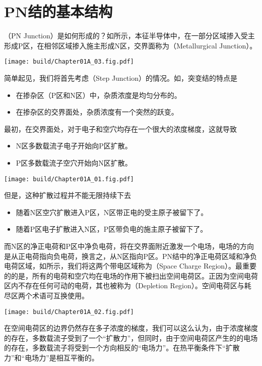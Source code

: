 \section{PN结的基本结构}

（PN Junction）是如何形成的？如所示，本征半导体中，在一部分区域掺入受主形成P区，在相邻区域掺入施主形成N区，交界面称为（Metallurgical Junction）。

\begin{Figure}[PN结的基本结构]
    \texttt{[image: build/Chapter01A\_03.fig.pdf]}
\end{Figure}

简单起见，我们将首先考虑（Step Junction）的情况。如，突变结的特点是
\begin{itemize}
    \item 在掺杂区（P区和N区）中，杂质浓度是均匀分布的。
    \item 在掺杂区的交界面处，杂质浓度有一个突然的跃变。
\end{itemize}\goodbreak

最初，在交界面处，对于电子和空穴均存在一个很大的浓度梯度，这就导致
\begin{itemize}
    \item N区多数载流子电子开始向P区扩散。
    \item P区多数载流子空穴开始向N区扩散。
\end{itemize}

\begin{Figure}[突变结的掺杂浓度曲线]
    \texttt{[image: build/Chapter01A\_01.fig.pdf]}
\end{Figure}


但是，这种扩散过程并不能无限持续下去
\begin{itemize}
    \item 随着N区空穴扩散进入P区，N区带正电的受主原子被留下了。
    \item 随着P区电子扩散进入N区，P区带负电的施主原子被留下了。
\end{itemize}

而N区的净正电荷和P区中净负电荷，将在交界面附近激发一个电场，电场的方向是从正电荷指向负电荷，换言之，从N区指向P区。PN结中的净正电荷区域和净负电荷区域，如所示，我们将这两个带电区域称为（Space Charge Region）。最重要的的是，所有的电荷和空穴均在电场的作用下被扫出空间电荷区。正因为空间电荷区内不存在任何可动的电荷，其也被称为（Depletion Region）。空间电荷区与耗尽区两个术语可互换使用。

\begin{Figure}[PN结的空间电荷区]
    \texttt{[image: build/Chapter01A\_02.fig.pdf]}
\end{Figure}

在空间电荷区的边界仍然存在多子浓度的梯度，我们可以这么认为，由于浓度梯度的存在，多数载流子受到了一个“扩散力”，但同时，由于空间电荷区产生的的电场的存在，多数载流子将受到一个方向相反的“电场力”。在热平衡条件下“扩散力”和“电场力”是相互平衡的。